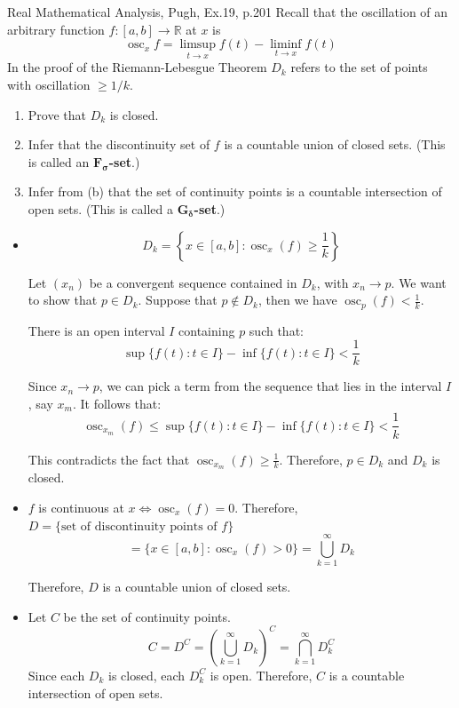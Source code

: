 \begin{problem}{}{}{Real Mathematical Analysis, Pugh, Ex.19, p.201}
Recall that the oscillation of an arbitrary function $f : [a,b] \to \mathbb{R}$ at $x$ is
\[
    \operatorname{osc}_x f = \limsup_{t \to x} f(t) - \liminf_{t \to x} f(t)
\]
In the proof of the Riemann-Lebesgue Theorem $D_k$ refers to the set of points
with oscillation $\ge 1/k$.
\begin{enumerate}
    \item[(a)] Prove that $D_k$ is closed.
    \item[(b)] Infer that the discontinuity set of $f$ is a countable union of closed sets.
          (This is called an \textbf{$\boldsymbol{F_\sigma}$-set}.)
    \item[(c)] Infer from (b) that the set of continuity points is a countable intersection
          of open sets. (This is called a \textbf{$\boldsymbol{G_\delta}$-set}.)
\end{enumerate}
\end{problem}

\begin{solution}
    \begin{itemize}
        \item[(a)]
              \[ D_k = \left\{ x \in [a,b] : \operatorname{osc}_x(f) \ge \frac{1}{k} \right\} \]

              Let $(x_n)$ be a convergent sequence contained in $D_k$, with $x_n \to p$.
              We want to show that $p \in D_k$. Suppose that $p \notin D_k$, then we
              have $\operatorname{osc}_p(f) < \frac{1}{k}$.

              There is an open interval $I$ containing $p$ such that:
              \[ \sup \{ f(t) : t \in I \} - \inf \{ f(t) : t \in I \} < \frac{1}{k} \]

              Since $x_n \to p$, we can pick a term from the sequence that lies in the interval $I$,
              say $x_m$. It follows that:
              \[ \operatorname{osc}_{x_m}(f) \le \sup \{ f(t) : t \in I \} - \inf \{ f(t) :
                  t \in I \} < \frac{1}{k} \]

              This contradicts the fact that $\operatorname{osc}_{x_m}(f) \ge \frac{1}{k}$.
              Therefore, $p \in D_k$ and $D_k$ is closed.
        \item[(b)]
              $f$ is continuous at $x \iff \operatorname{osc}_x(f) = 0$. Therefore,
              $D = \{ \text{set of discontinuity points of } f \}$
              \[ = \{x \in [a,b] : \operatorname{osc}_x(f) > 0\} = \bigcup_{k=1}^{\infty} D_k \]

              Therefore, $D$ is a countable union of closed sets.
        \item[(c)]
              Let $C$ be the set of continuity points. 
              \[ C = D^C = \left( \bigcup_{k=1}^\infty D_k \right)^C = \bigcap_{k=1}^\infty D_k^C \]
              Since each $D_k$ is closed, each $D_k^C$ is open. Therefore, $C$ is a 
              countable intersection of open sets.
    \end{itemize}
\end{solution}
